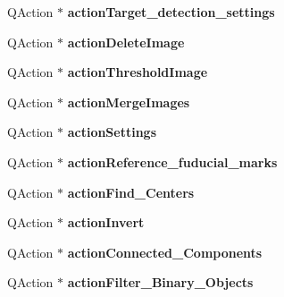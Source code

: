 \begin{DoxyCompactItemize}
\mbox{\label{class_ui___main_window_a73ead9e34e1c793ff8bd66273a39d85f}} 
Q\+Action $\ast$ {\bfseries action\+Target\+\_\+detection\+\_\+settings}
\item 
\mbox{\label{class_ui___main_window_afd5c7c8811f901975159d3f645f27254}} 
Q\+Action $\ast$ {\bfseries action\+Delete\+Image}
\item 
\mbox{\label{class_ui___main_window_a1999eecc51bf8ad6af873090620f1beb}} 
Q\+Action $\ast$ {\bfseries action\+Threshold\+Image}
\item 
\mbox{\label{class_ui___main_window_a1bd44b333988ac473bee1e1fb7cd0f86}} 
Q\+Action $\ast$ {\bfseries action\+Merge\+Images}
\item 
\mbox{\label{class_ui___main_window_a5b65436e6cc259d5586eb6e309b612e4}} 
Q\+Action $\ast$ {\bfseries action\+Settings}
\item 
\mbox{\label{class_ui___main_window_a3ba4bf9df15ea253554ed735ec503545}} 
Q\+Action $\ast$ {\bfseries action\+Reference\+\_\+fuducial\+\_\+marks}
\item 
\mbox{\label{class_ui___main_window_a1e144f031641c731def4b2b67bfd90c7}} 
Q\+Action $\ast$ {\bfseries action\+Find\+\_\+\+Centers}
\item 
\mbox{\label{class_ui___main_window_a942f00b08d5246ae17f406479f62e488}} 
Q\+Action $\ast$ {\bfseries action\+Invert}
\item 
\mbox{\label{class_ui___main_window_abfa990a9bf6252edf01b81d476b1068f}} 
Q\+Action $\ast$ {\bfseries action\+Connected\+\_\+\+Components}
\item 
\mbox{\label{class_ui___main_window_a404c2e3902af4b5203058ca3f6accf93}} 
Q\+Action $\ast$ {\bfseries action\+Filter\+\_\+\+Binary\+\_\+\+Objects}
\item 
\mbox{\label{class_ui___main_window_a81c4b849341ee0fa6d2bc569fc32e183}} 

\end{DoxyCompactItemize}
